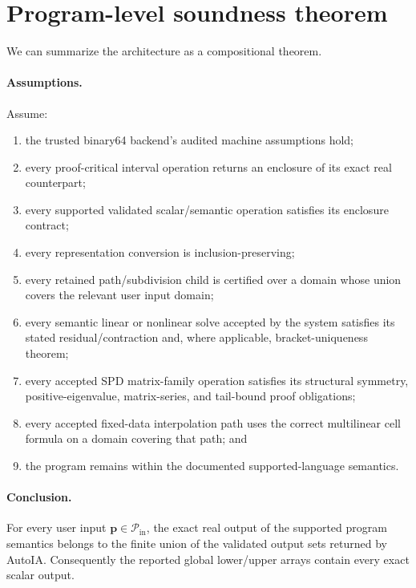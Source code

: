 \documentclass[11pt]{article}
\newcommand{\Pin}{\mathcal{P}_{\mathrm{in}}}
\newcommand{\pv}{\mathbf{p}}
\begin{document}
\section{Program-level soundness theorem}

We can summarize the architecture as a compositional theorem.

\paragraph{Assumptions.}
Assume:
\begin{enumerate}[leftmargin=*]
\item the trusted binary64 backend's audited machine assumptions hold;
\item every proof-critical interval operation returns an enclosure of its exact
real counterpart;
\item every supported validated scalar/semantic operation satisfies its enclosure
contract;
\item every representation conversion is inclusion-preserving;
\item every retained path/subdivision child is certified over a domain whose
union covers the relevant user input domain;
\item every semantic linear or nonlinear solve accepted by the system satisfies
its stated residual/contraction and, where applicable, bracket-uniqueness theorem;
\item every accepted SPD matrix-family operation satisfies its structural symmetry,
positive-eigenvalue, matrix-series, and tail-bound proof obligations;
\item every accepted fixed-data interpolation path uses the correct multilinear
cell formula on a domain covering that path; and
\item the program remains within the documented supported-language semantics.
\end{enumerate}

\paragraph{Conclusion.}
For every user input \(\pv\in\Pin\), the exact real output of the supported
program semantics belongs to the finite union of the validated output sets
returned by AutoIA.  Consequently the reported global lower/upper arrays contain
every exact scalar output.
\end{document}
